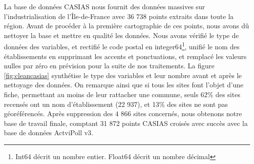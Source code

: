 \documentclass[a4paper,twoside,12pt]{book}
\begin{document}
La base de données CASIAS nous fournit des données massives sur l'industrialisation de l'Île-de-France avec 36 738 points extraits dans toute la région. Avant de procéder à la première cartographie de ces points, nous avons dû nettoyer la base et mettre en qualité les données. Nous avons vérifié le type de données des variables, et rectifié le code postal en integer64\footnote{Int64 décrit un nombre entier. Float64 décrit un nombre décimal}, unifié le nom des établissements en supprimant les accents et ponctuations, et remplacé les valeurs nulles par zéro en prévision pour la suite de nos traitements. La figure \ref{fig:cleancasias} synthétise le type des variables et leur nombre avant et après le nettoyage des données. On remarque ainsi que si tous les sites font l'objet d'une fiche, permettant au moins de leur rattacher une commune, seuls 62\% des sites recensés ont un nom d'établissement (22 937), et 13\% des sites ne sont pas géoréférencés. Après suppression des 4 866 sites concernés, nous obtenons notre base de travail finale, comptant 31 872 points CASIAS croisés avec succès avec la base de données ActviPoll v3. 
\end{document}
